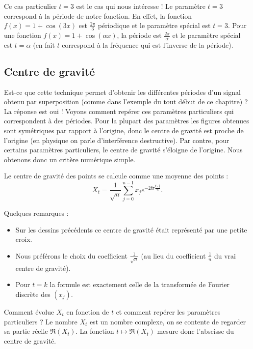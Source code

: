 \documentclass[11pt,class=report,crop=false]{standalone}
\begin{document}
Ce cas particulier $t=3$ est le cas qui nous intéresse ! Le paramètre $t=3$ correspond à la période de notre fonction. En effet, la fonction $f(x) = 1 + \cos(3x)$ est $\frac{2\pi}{3}$ périodique et le paramètre spécial est $t=3$.
Pour une fonction $f(x) = 1 + \cos(\alpha x)$, la période est $\frac{2\pi}{\alpha}$ et le paramètre spécial est $t=\alpha$ (en fait $t$ correspond à la fréquence qui est l'inverse de la période). 






\subsection{Centre de gravité}


Est-ce que cette technique permet d'obtenir les différentes périodes d'un signal obtenu par superposition (comme dans l'exemple du tout début de ce chapitre) ? La réponse est oui !
Voyons comment repérer ces paramètres particuliers qui correspondent à des périodes.
Pour la plupart des paramètres les figures obtenues sont symétriques par rapport à l'origine, donc le centre de gravité est proche de l'origine (en physique on parle d'interférence destructive). Par contre, pour certains paramètres particuliers, le centre de gravité s'éloigne de l'origine. Nous obtenons donc un critère numérique simple.

Le centre de gravité des points se calcule comme une moyenne des points :
$$X_t = \frac{1}{\sqrt n}\sum_{j=0}^{n-1} x_j e^{-2\ii\pi \frac{t \cdot j}{n}}.$$

Quelques remarques :
\begin{itemize}
  \item Sur les dessins précédents ce centre de gravité était représenté par une petite croix.
  \item Nous préférons le choix du coefficient $\frac{1}{\sqrt n}$  (au lieu du coefficient $\frac1n$ du vrai centre de gravité).
  \item Pour $t=k$ la formule est exactement celle de la transformée de Fourier discrète des $(x_j)$.
\end{itemize}

Comment évolue $X_t$ en fonction de $t$ et comment repérer les paramètres particuliers ?
Le nombre $X_t$ est un nombre complexe, on se contente de regarder sa partie réelle
$\Re(X_t)$. La fonction $t \mapsto \Re(X_t)$ mesure donc l'abscisse du centre de gravité.
\end{document}
